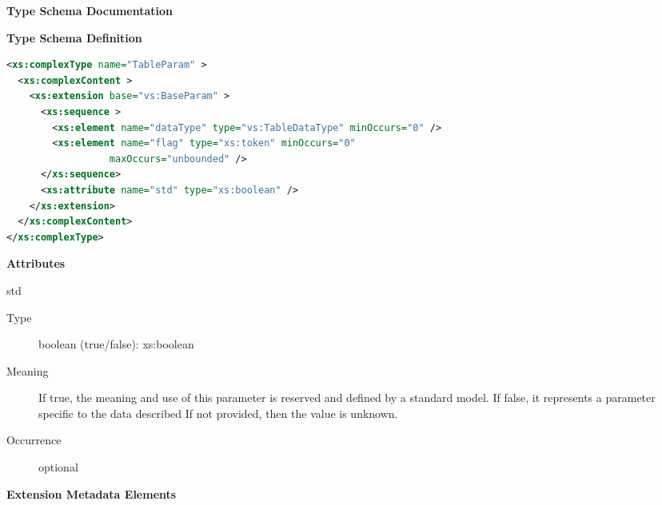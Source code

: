 \documentclass[11pt,a4paper]{ivoa}
\begin{document}
\begin{generated}
\begingroup
        \renewcommand*\descriptionlabel[1]{%
        \hbox to 5.5em{\emph{#1}\hfil}}\vspace{2ex}\noindent\textbf{ Type Schema Documentation}


\vspace{1ex}\noindent\textbf{ Type Schema Definition}

\begin{lstlisting}[language=XML,basicstyle=\footnotesize]
<xs:complexType name="TableParam" >
  <xs:complexContent >
    <xs:extension base="vs:BaseParam" >
      <xs:sequence >
        <xs:element name="dataType" type="vs:TableDataType" minOccurs="0" />
        <xs:element name="flag" type="xs:token" minOccurs="0"
                  maxOccurs="unbounded" />
      </xs:sequence>
      <xs:attribute name="std" type="xs:boolean" />
    </xs:extension>
  </xs:complexContent>
</xs:complexType>
\end{lstlisting}

\vspace{0.5ex}\noindent\textbf{ Attributes}

\begingroup\small\begin{bigdescription}
\item[std]
\begin{description}
\item[Type] boolean (true/false): xs:boolean
\item[Meaning]
                     If true, the meaning and use of this parameter is
                     reserved and defined by a standard model.  If false,
                     it represents a parameter specific to the data described
                     If not provided, then the value is unknown.

\item[Occurrence] optional
\end{description}


\end{bigdescription}\endgroup



\vspace{0.5ex}\noindent\textbf{ Extension Metadata Elements}


\end{generated}
\end{document}

